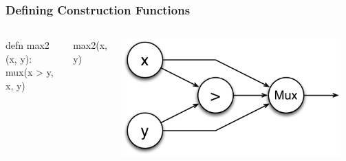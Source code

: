 \documentclass[xcolor=pdflatex,dvipsnames,table]{beamer}
\begin{document}
\begin{frame}[fragile]
\frametitle{Defining Construction Functions}

\begin{columns}


\begin{stanza}
defn max2 (x, y): mux(x > y, x, y)
\end{stanza}
\begin{stanza}
max2(x, y)
\end{stanza}


\begin{center}
\includegraphics[width=0.95\textwidth]{figs/Max2.pdf} \\[1cm]
\end{center}

\end{columns}

\end{frame}
\end{document}
